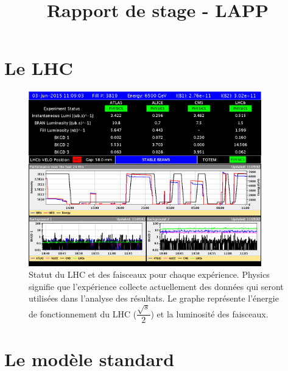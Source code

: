 \documentclass[11pt]{article} %
\title{Rapport de stage - LAPP}
\begin{document}
\maketitle


\section{Le LHC}

\begin{figure}[H]
\centering
  \caption{Statut du LHC et des faisceaux pour chaque expérience. \og Physics \fg signifie que l'expérience collecte actuellement des données qui seront utilisées dans l'analyse des résultats.  Le graphe représente l'énergie de fonctionnement du LHC ($\dfrac{\sqrt{s}}{2}$) et la luminosité des faisceaux. }
 \includegraphics[width=0.9\textwidth]{../images/lhc3.png}
\end{figure}

\section{Le modèle standard}
\end{document}

